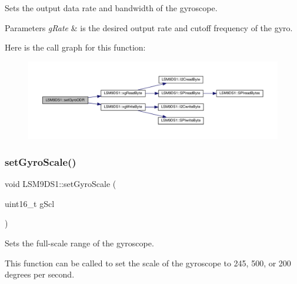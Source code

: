 Sets the output data rate and bandwidth of the gyroscope. 


\begin{DoxyParams}{Parameters}
{\em g\+Rate} & is the desired output rate and cutoff frequency of the gyro. \\
\hline
\end{DoxyParams}
Here is the call graph for this function\+:\nopagebreak
\begin{figure}[H]
\begin{center}
\leavevmode
\includegraphics[width=350pt]{classLSM9DS1_ab8fc33c8da4fc5c379e880ff57d331fa_cgraph}
\end{center}
\end{figure}
\mbox{\label{classLSM9DS1_a115d304ebcdc8c701f3e5a5d397250aa}} 
\subsubsection{\texorpdfstring{set\+Gyro\+Scale()}{setGyroScale()}}
{\footnotesize\ttfamily void L\+S\+M9\+D\+S1\+::set\+Gyro\+Scale (\begin{DoxyParamCaption}\item[{uint16\+\_\+t}]{g\+Scl }\end{DoxyParamCaption})}



Sets the full-\/scale range of the gyroscope. 

This function can be called to set the scale of the gyroscope to 245, 500, or 200 degrees per second.


